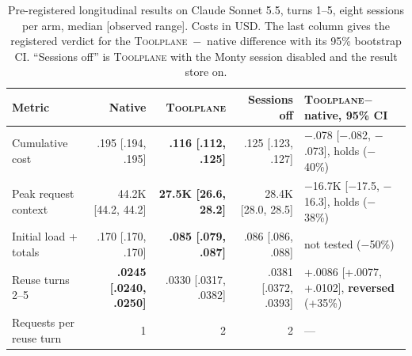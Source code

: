 \documentclass[10pt,twocolumn]{article}
\newcommand{\toolplane}{\textsc{Toolplane}\xspace}
\begin{document}
\begin{table}[t]
\centering
\scriptsize
\caption{Pre-registered longitudinal results on Claude Sonnet 5.5, turns 1--5,
eight sessions per arm, median [observed range].  Costs in USD.  The last
column gives the registered verdict for the \toolplane~$-$~native difference
with its 95\% bootstrap CI.  ``Sessions off'' is \toolplane with the Monty
session disabled and the result store on.}
\label{tab:session}
\begin{tabular}{lrrrl}
\toprule
Metric & Native & \toolplane & Sessions off & \toolplane $-$ native, 95\% CI \\
\midrule
Cumulative cost & .195 [.194, .195] & \textbf{.116 [.112, .125]} & .125 [.123, .127] & $-$.078 [$-$.082, $-$.073], holds ($-$40\%) \\
Peak request context & 44.2K [44.2, 44.2] & \textbf{27.5K [26.6, 28.2]} & 28.4K [28.0, 28.5] & $-$16.7K [$-$17.5, $-$16.3], holds ($-$38\%) \\
Initial load + totals & .170 [.170, .170] & \textbf{.085 [.079, .087]} & .086 [.086, .088] & not tested ($-$50\%) \\
Reuse turns 2--5 & \textbf{.0245 [.0240, .0250]} & .0330 [.0317, .0382] & .0381 [.0372, .0393] & +.0086 [+.0077, +.0102], \textbf{reversed} (+35\%) \\
Requests per reuse turn & 1 & 2 & 2 & --- \\
\bottomrule
\end{tabular}
\end{table}
\end{document}

